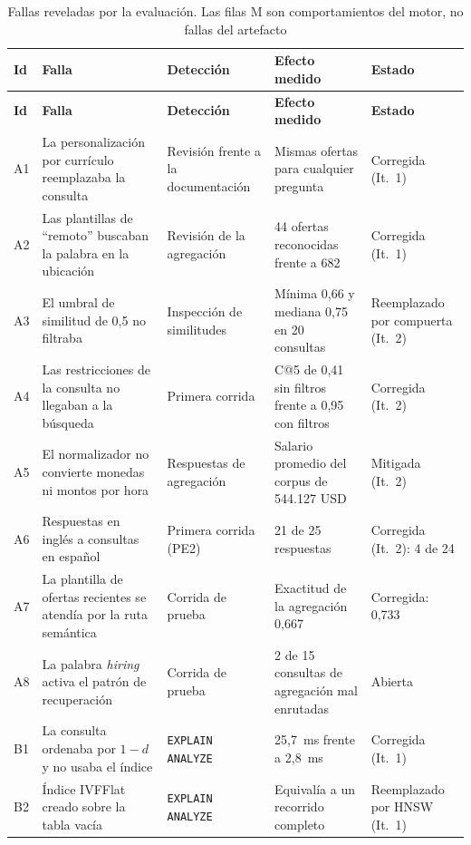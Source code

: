 {\small
\begin{longtable}{|p{0.6cm}|p{4.4cm}|p{2.8cm}|p{3.6cm}|p{2.6cm}|}
    \caption{Fallas reveladas por la evaluación. Las filas M son comportamientos del motor, no fallas del artefacto}
    \label{tab:res-fallas} \\
    \hline
    \textbf{Id} & \textbf{Falla} & \textbf{Detección} & \textbf{Efecto medido} & \textbf{Estado} \\
    \hline
    \endfirsthead
    \hline
    \textbf{Id} & \textbf{Falla} & \textbf{Detección} & \textbf{Efecto medido} & \textbf{Estado} \\
    \hline
    \endhead
    A1 & La personalización por currículo reemplazaba la consulta & Revisión frente a la documentación & Mismas ofertas para cualquier pregunta & Corregida (It.~1) \\
    \hline
    A2 & Las plantillas de \enquote{remoto} buscaban la palabra en la ubicación & Revisión de la agregación & 44 ofertas reconocidas frente a 682 & Corregida (It.~1) \\
    \hline
    A3 & El umbral de similitud de 0,5 no filtraba & Inspección de similitudes & Mínima 0,66 y mediana 0,75 en 20 consultas & Reemplazado por compuerta (It.~2) \\
    \hline
    A4 & Las restricciones de la consulta no llegaban a la búsqueda & Primera corrida & C@5 de 0,41 sin filtros frente a 0,95 con filtros & Corregida (It.~2) \\
    \hline
    A5 & El normalizador no convierte monedas ni montos por hora & Respuestas de agregación & Salario promedio del corpus de 544.127 USD & Mitigada (It.~2) \\
    \hline
    A6 & Respuestas en inglés a consultas en español & Primera corrida (PE2) & 21 de 25 respuestas & Corregida (It.~2): 4 de 24 \\
    \hline
    A7 & La plantilla de ofertas recientes se atendía por la ruta semántica & Corrida de prueba & Exactitud de la agregación 0,667 & Corregida: 0,733 \\
    \hline
    A8 & La palabra \textit{hiring} activa el patrón de recuperación & Corrida de prueba & 2 de 15 consultas de agregación mal enrutadas & Abierta \\
    \hline
    B1 & La consulta ordenaba por $1-d$ y no usaba el índice & \texttt{EXPLAIN ANALYZE} & 25,7~ms frente a 2,8~ms & Corregida (It.~1) \\
    \hline
    B2 & Índice IVFFlat creado sobre la tabla vacía & \texttt{EXPLAIN ANALYZE} & Equivalía a un recorrido completo & Reemplazado por HNSW (It.~1) \\

\end{longtable}}
